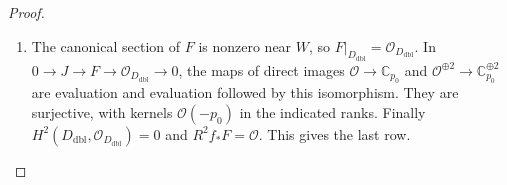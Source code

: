 \begin{proof}
\begin{enumerate}[label=\arabic*.,leftmargin=*]
\item The canonical section of $F$ is nonzero near $W$, so $F|_{D_{\mathrm{dbl}}}=\mathcal O_{D_{\mathrm{dbl}}}$.
In $0\to J\to F\to\mathcal O_{D_{\mathrm{dbl}}}\to0$, the maps of direct images
$\mathcal O\to\mathbb C_{p_0}$ and
$\mathcal O^{\oplus2}\to\mathbb C_{p_0}^{\oplus2}$ are evaluation and
evaluation followed by this isomorphism.  They are surjective, with
kernels $\mathcal O(-p_0)$ in the indicated ranks.  Finally
$H^2(D_{\mathrm{dbl}},\mathcal O_{D_{\mathrm{dbl}}})=0$ and $R^2f_*F=\mathcal O$.  This gives the last row.
\end{enumerate}
\end{proof}